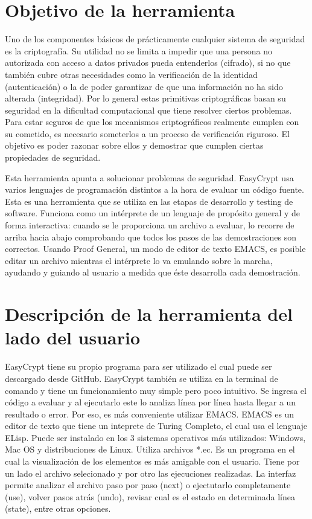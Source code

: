 \documentclass[runningheads,a4paper]{llncs}
\begin{document}
\section{Objetivo de la herramienta} 
Uno de los componentes básicos de prácticamente cualquier sistema de seguridad es la criptografía. Su utilidad no se limita a impedir que una persona no autorizada con acceso a datos privados pueda entenderlos (cifrado), si no que también cubre otras necesidades como la verificación de la identidad (autenticación) o la de poder garantizar de que una información no ha sido alterada (integridad). Por lo general estas primitivas criptográficas basan su seguridad en la dificultad computacional que tiene resolver ciertos problemas. Para estar seguros de que los mecanismos criptográficos realmente cumplen con su cometido, es necesario someterlos a un proceso de verificación riguroso. El objetivo es poder razonar sobre ellos y demostrar que cumplen ciertas propiedades de seguridad. 

Esta herramienta apunta a solucionar problemas de seguridad. EasyCrypt usa varios lenguajes de programación distintos a la hora de evaluar un código fuente. Esta es una herramienta que se utiliza en las etapas de desarrollo y testing de software. Funciona como un intérprete de un lenguaje de propósito general y de forma interactiva: cuando se le proporciona un archivo a evaluar, lo recorre de arriba hacia abajo comprobando que todos los pasos de las demostraciones son correctos. Usando Proof General, un modo de editor de texto EMACS, es posible editar un archivo mientras el intérprete lo va emulando sobre la marcha, ayudando y guiando al usuario a medida que éste desarrolla cada demostración. 

\section{Descripción de la herramienta del lado del usuario}

EasyCrypt tiene su propio programa para ser utilizado el cual puede ser descargado desde GitHub.\cite{link1}
EasyCrypt también se utiliza en la terminal de comando y tiene un funcionamiento muy simple pero poco intuitivo. Se ingresa el código a evaluar y al ejecutarlo este lo analiza línea por línea hasta llegar a un resultado o error. Por eso, es más conveniente utilizar EMACS\cite{link2}. EMACS es un editor de texto que tiene un inteprete de Turing Completo, el cual usa el lenguaje ELisp. Puede ser instalado en los 3 sistemas operativos más utilizados: Windows, Mac OS y distribuciones de Linux. Utiliza archivos *.ec. Es un programa en el cual la visualización de los elementos es más amigable con el usuario. Tiene por un lado el archivo selecionado y por otro las ejecuciones realizadas. La interfaz permite analizar el archivo paso por paso (next) o ejectutarlo completamente (use), volver pasos atrás (undo), revisar cual es el estado en determinada línea (state), entre otras opciones.
\end{document}
